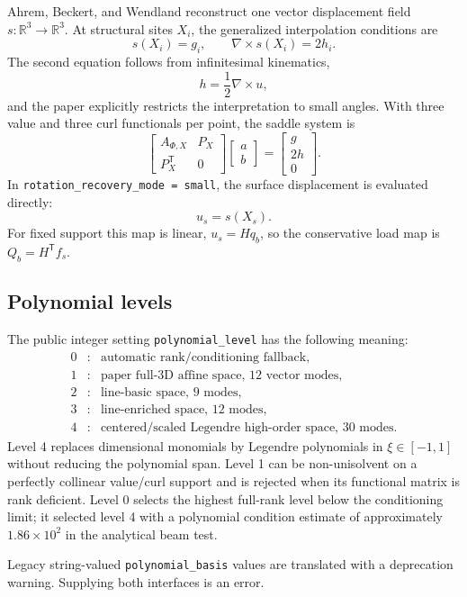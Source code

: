 \documentclass[11pt,a4paper]{article}
\newcommand{\RR}{\mathbb{R}}
\newcommand{\T}{\mathsf{T}}
\newcommand{\curl}{\nabla\times}
\begin{document}
Ahrem, Beckert, and Wendland reconstruct one vector displacement field
\(s:\RR^3\rightarrow\RR^3\).  At structural sites \(X_i\), the generalized
interpolation conditions are
\[
  s(X_i)=g_i,\qquad \curl s(X_i)=2h_i.
\]
The second equation follows from infinitesimal kinematics,
\[
  h=\frac12\curl u,
\]
and the paper explicitly restricts the interpretation to small angles.  With
three value and three curl functionals per point, the saddle system is
\[
\begin{bmatrix}
 A_{\Phi,X}&P_X\\
 P_X^\T&0
\end{bmatrix}
\begin{bmatrix}a\\b\end{bmatrix}
=
\begin{bmatrix}g\\2h\\0\end{bmatrix}.
\]
In \texttt{rotation\_recovery\_mode = small}, the surface displacement is
evaluated directly:
\[
  u_s=s(X_s).
\]
For fixed support this map is linear, \(u_s=Hq_b\), so the conservative load
map is \(Q_b=H^\T f_s\).

\subsection{Polynomial levels}

The public integer setting \texttt{polynomial\_level} has the following
meaning:
\[
\begin{array}{ccl}
0&:&\text{automatic rank/conditioning fallback},\\
1&:&\text{paper full-3D affine space, 12 vector modes},\\
2&:&\text{line-basic space, 9 modes},\\
3&:&\text{line-enriched space, 12 modes},\\
4&:&\text{centered/scaled Legendre high-order space, 30 modes}.
\end{array}
\]
Level 4 replaces dimensional monomials by Legendre polynomials in
\(\xi\in[-1,1]\) without reducing the polynomial span.  Level 1 can be
non-unisolvent on a perfectly collinear value/curl support and is rejected
when its functional matrix is rank deficient.  Level 0 selects the highest
full-rank level below the conditioning limit; it selected level 4 with a
polynomial condition estimate of approximately \(1.86\times10^2\) in the
analytical beam test.

Legacy string-valued \texttt{polynomial\_basis} values are translated with a
deprecation warning.  Supplying both interfaces is an error.
\end{document}
